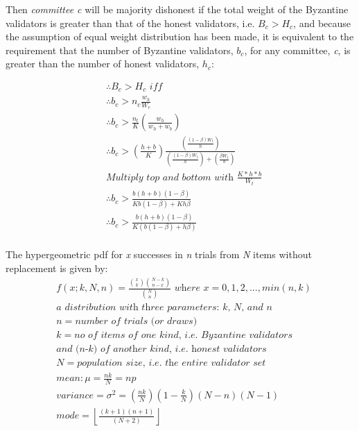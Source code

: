 \documentclass{article}
\begin{document}
Then \textit{committee c} will be majority dishonest if the total weight of the
Byzantine validators is greater than that of the honest validators, i.e. $B_c >
H_c$, and because the assumption of equal weight distribution has been made, it
is equivalent to the requirement that the number of Byzantine validators,
$b_c$, for any committee, \textit{c}, is greater than the number of honest
validators, $h_c$:

\begin{equation*}
\begin{split}
& \therefore B_c > H_c \textit{ iff} \\
& \therefore b_c > n_c  \frac{w_h}{W_c} \\
& \therefore b_c > \frac{n_t}{K} \left( \frac{w_h}{w_h + w_b} \right) \\
& \therefore b_c > \left( \frac{h + b}{K} \right) \frac{\left( \frac{(1-\beta) W_t}{h} \right)}{\left( \frac{(1-\beta) W_t}{h} \right) + \left( \frac{\beta W_t}{b} \right)} \\
& \textit{Multiply top and bottom with } \frac{K * h * b}{W_t} \\
& \therefore b_c > \frac{ b(h + b) (1 - \beta)}{K b (1-\beta) + K h \beta } \\
& \therefore b_c > \frac{ b(h + b) (1 - \beta)}{K(b (1-\beta) + h \beta) } \\
\end{split}
\end{equation*}

\noindent
The hypergeometric \gls{pdf} for \textit{x} successes in \textit{n} trials from
\textit{N} items without replacement is given by:
\begin{equation*}
  \begin{split}
& f(x; k, N, n) = \frac{\binom{x}{k} \binom{N-k}{n-x}}{\binom{N}{n}} \textit{ where } x = 0, 1, 2, ..., min(n,k) \\
& \textit{a distribution with three parameters: k, N, and n} \\
& n = \textit{number of trials (or draws)} \\
& k = \textit{no of items of one kind, i.e. Byzantine validators}  \\
& \textit{and (n-k) of another kind, i.e. honest validators} \\
& N = \textit{population size, i.e. the entire validator set} \\
& mean: \mu = \frac{nk}{N} = np \\
& variance = \sigma^2 = \left( \frac{nk}{N} \right) \left(1 - \frac{k}{N} \right) (N-n)(N-1) \\
& mode = \left\lfloor \frac{(k+1)(n+1)}{(N+2)} \right\rfloor
  \end{split}
\end{equation*}
\end{document}
